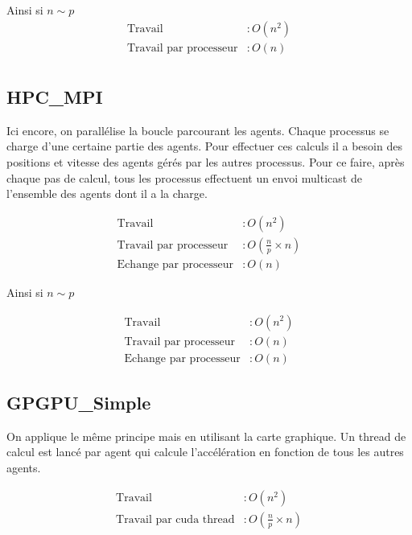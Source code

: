 \documentclass[liens,entete-ensimag,margeCorrection]{ensirapport}
\begin{document}
Ainsi si $n\sim p$
\begin{align*}
    \text{Travail} &: O\left( n^2 \right)  \\
    \text{Travail par processeur} &: O\left( n \right) \\
\end{align*}

\subsection{HPC\_MPI}
Ici encore, on parallélise la boucle parcourant les agents.
Chaque processus se charge d'une certaine partie des agents.
Pour effectuer ces calculs il a besoin des positions et vitesse des agents gérés par les autres processus.
Pour ce faire, après chaque pas de calcul, tous les processus effectuent un envoi multicast de l'ensemble des agents dont il a la charge.

\begin{align*}
    \text{Travail} &: O\left( n^2 \right) \\
    \text{Travail par processeur} &: O\left( \frac n p \times n \right)  \\
    \text{Echange par processeur} &: O\left(n\right)
\end{align*}

Ainsi si $n \sim p$

\begin{align*}
    \text{Travail} &: O\left( n^2 \right) \\
    \text{Travail par processeur} &: O\left( n \right)  \\
    \text{Echange par processeur} &: O\left(n\right)
\end{align*}

\subsection{GPGPU\_Simple}

On applique le même principe mais en utilisant la carte graphique. Un thread de calcul est lancé par agent qui calcule l'accélération en fonction de tous les autres agents.

\begin{align*}
    \text{Travail} &: O\left( n^2 \right) \\
    \text{Travail par cuda thread} &: O\left( \frac n p \times n \right)  \\
\end{align*}
\end{document}
